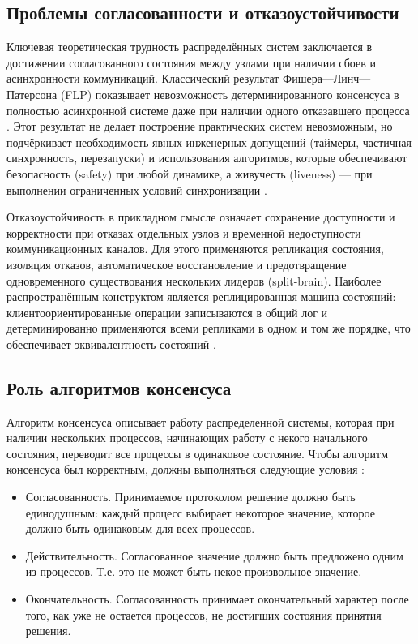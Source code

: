 \subsection{Проблемы согласованности и отказоустойчивости}

Ключевая теоретическая трудность распределённых систем заключается в достижении
согласованного состояния между узлами при наличии сбоев и асинхронности
коммуникаций. Классический результат Фишера—Линч—Патерсона (FLP) показывает
невозможность детерминированного консенсуса в полностью асинхронной системе
даже при наличии одного отказавшего процесса \cite{flp1985}. Этот результат не
делает построение практических систем невозможным, но подчёркивает
необходимость явных инженерных допущений (таймеры, частичная синхронность,
перезапуски) и использования алгоритмов, которые обеспечивают безопасность
(safety) при любой динамике, а живучесть (liveness) — при выполнении
ограниченных условий синхронизации \cite{lynch1996,birman2012}.

Отказоустойчивость в прикладном смысле означает сохранение доступности и
корректности при отказах отдельных узлов и временной недоступности
коммуникационных каналов. Для этого применяются репликация состояния, изоляция
отказов, автоматическое восстановление и предотвращение одновременного
существования нескольких лидеров (split-brain). Наиболее распространённым
конструктом является реплицированная машина состояний: клиентоориентированные
операции записываются в общий лог и детерминированно применяются всеми
репликами в одном и том же порядке, что обеспечивает эквивалентность состояний
\cite{coulouris2012,lynch1996}.

\subsection{Роль алгоритмов консенсуса}

Алгоритм консенсуса описывает работу распределенной системы, которая при наличии
нескольких процессов, начинающих работу с некого начального состояния, переводит
все процессы в одинаковое состояние. Чтобы алгоритм консенсуса был корректным,
должны выполняться следующие условия \cite{petrov}:

\begin{itemize}
    \item Согласованность. Принимаемое протоколом решение должно быть единодушным:
        каждый процесс  выбирает некоторое значение, которое должно быть
        одинаковым для всех процессов.
    \item Действительность. Согласованное значение должно быть предложено одним
        из процессов. Т.е. это не может быть некое произвольное значение.
    \item Окончательность. Согласованность принимает окончательный характер после
        того, как уже не остается процессов, не достигших состояния принятия решения.
\end{itemize}


